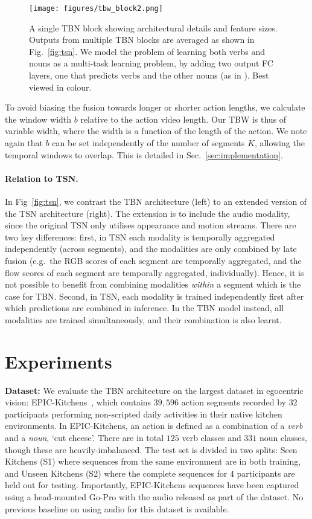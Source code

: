 \documentclass[10pt,twocolumn,letterpaper]{article}
\begin{document}
 \begin{figure}[t]
	\centering
	\texttt{[image: figures/tbw\_block2.png]}
	\caption{A single TBN block showing architectural details and feature sizes. Outputs from multiple TBN blocks are averaged as shown in Fig.~\ref{fig:tsn}. We model the problem of learning both verbs and nouns as a multi-task learning problem, by adding two output FC layers, one that predicts verbs and the other nouns (as in \cite{Damen_2018_ECCV}). Best viewed in colour.}
	\label{fig:tsn2}
\end{figure} 
To avoid biasing the fusion towards longer or shorter action lengths, we calculate the window width $b$ relative to the action video length.
Our TBW is thus of variable width, where the width is a function of the length of the action. We note again that $b$ can be set independently of the number of segments $K$, allowing the temporal windows to overlap. This is detailed in Sec.~\ref{sec:implementation}. 

\vspace*{-6pt}
\paragraph{Relation to TSN.} In Fig~\ref{fig:tsn}, we contrast the TBN architecture (left) to an extended version of the TSN architecture (right). The extension is to include the audio modality, since the original TSN only utilises appearance and motion streams. There are two key differences: first, in TSN each modality is temporally aggregated independently (across segments), and the modalities are only combined by late fusion (e.g.\ the RGB scores of each segment are temporally aggregated, and the flow scores of each segment are temporally aggregated, individually). Hence, it is not possible to benefit from combining modalities {\em within} a segment which is the case for TBN. Second, in TSN, each modality is trained independently first after which predictions are combined in inference. 
In the TBN model instead, all modalities are trained simultaneously, and their combination is also learnt. 


\section{Experiments}
\noindent \textbf{Dataset:} 
We evaluate the TBN architecture on the largest dataset in egocentric vision: EPIC-Kitchens~\cite{Damen_2018_ECCV},
which contains $39,596$ action segments recorded by $32$ participants performing non-scripted daily activities in their native kitchen environments. In EPIC-Kitchens, an action
is defined as a combination of a \textit{verb} and a \textit{noun}, \eg `cut cheese'. There are in total $125$ verb classes and $331$
noun classes, though these are heavily-imbalanced. The test set is divided in two splits: Seen Kitchens (S1) where sequences from the same environment are in both training, and Unseen Kitchens (S2) where the complete sequences for $4$ participants are held out for testing.
Importantly, EPIC-Kitchens sequences have been captured using a head-mounted Go-Pro with the audio released as part of the dataset. No previous baseline on using audio for this dataset is available.
\end{document}
